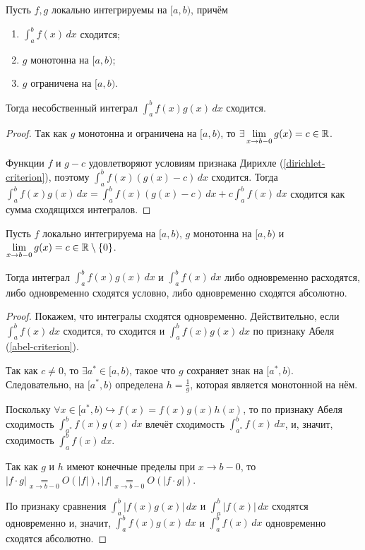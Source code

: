 \begin{theorem}
    \label{abel-criterion}

    Пусть $f, g$ локально интегрируемы на $[a, b)$, причём
    \begin{enumerate}
        \item $\int_a^b f(x)\, dx$ сходится;
        \item $g$ монотонна на $[a, b)$;
        \item $g$ ограничена на $[a, b)$.
    \end{enumerate}

    Тогда несобственный интеграл $\int_a^b f(x)g(x)\, dx$ сходится.

    \begin{proof}
        Так как $g$ монотонна и ограничена на $[a, b)$, то $\displaystyle \exists \lim_{x \rightarrow b - 0} g(x) = c \in \mathbb{R}$.
        
        Функции $f$ и $g - c$ удовлетворяют условиям признака Дирихле (\ref{dirichlet-criterion}), поэтому $\int_a^b f(x)\left(g(x) - c\right)\, dx$ сходится. Тогда $\int_a^b f(x)g(x)\, dx = \int_a^b f(x)(g(x) - c)\, dx + c \int_a^b f(x)\, dx$ сходится как сумма сходящихся интегралов.
    \end{proof}
\end{theorem}

\begin{corollary}
    Пусть $f$ локально интегрируема на $[a, b)$, $g$ монотонна на $[a, b)$ и $\displaystyle \lim_{x \rightarrow b - 0} g(x) = c \in \mathbb{R} \setminus \{0\}$.

    Тогда интеграл $\int_a^b f(x)g(x)\, dx$ и $\int_a^b f(x)\, dx$ либо одновременно расходятся, либо одновременно сходятся условно, либо одновременно сходятся абсолютно.

    \begin{proof}
        Покажем, что интегралы сходятся одновременно. Действительно, если $\int_a^b f(x)\, dx$ сходится, то сходится и $\int_a^b f(x)g(x)\, dx$ по признаку Абеля (\ref{abel-criterion}).

        Так как $c \neq 0$, то $\exists a^* \in [a, b)$, такое что $g$ сохраняет знак на $[a^*, b)$. Следовательно, на $[a^*, b)$ определена $h = \frac{1}{g}$, которая является монотонной на нём.

    Поскольку $\forall x \in [a^*, b) \hookrightarrow f(x) = f(x)g(x)h(x)$, то по признаку Абеля сходимость $\int_{a^*}^b f(x)g(x)\, dx$ влечёт сходимость $\int_{a^*}^b f(x)\, dx$, и, значит, сходимость $\int_a^b f(x)\, dx$.

    Так как $g$ и $h$ имеют конечные пределы при $x \rightarrow b - 0$, то $|f \cdot g| \underset{x \rightarrow b - 0}{=} O\left(|f|\right), |f| \underset{x \rightarrow b - 0}{=} O(|f \cdot g|)$.

    По признаку сравнения $\int_a^b |f(x)g(x)|\, dx$ и $\int_a^b |f(x)|\, dx$ сходятся одновременно и, значит, $\int_a^b f(x)g(x)\, dx$ и $\int_a^b f(x)\, dx$ одновременно сходятся абсолютно.
    \end{proof}
\end{corollary}

